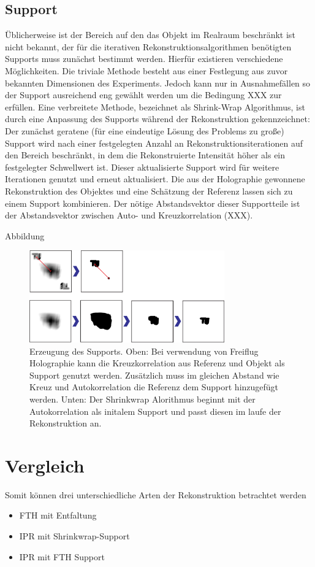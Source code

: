 \subsection{Support}
Üblicherweise ist der Bereich auf den das Objekt im Realraum beschränkt ist nicht bekannt, der für die iterativen Rekonstruktionsalgorithmen benötigten Supports muss zunächst bestimmt werden. Hierfür existieren verschiedene Möglichkeiten. Die triviale Methode besteht aus einer Festlegung aus zuvor bekannten Dimensionen des Experiments. Jedoch kann nur in Ausnahmefällen so der Support ausreichend eng gewählt werden um die Bedingung XXX zur erfüllen.
Eine verbreitete Methode, bezeichnet als Shrink-Wrap Algorithmus, ist durch eine Anpassung des Supports während der Rekonstruktion gekennzeichnet: Der zunächst geratene (für eine eindeutige Lösung des Problems  zu große) Support wird nach einer festgelegten Anzahl an Rekonstruktionsiterationen auf den Bereich beschränkt, in dem die Rekonstruierte Intensität höher als ein festgelegter Schwellwert ist. Dieser aktualisierte Support wird für weitere Iterationen genutzt und erneut aktualisiert\cite{marchesini2003}.
Die aus der Holographie gewonnene Rekonstruktion des Objektes und eine Schätzung der Referenz lassen sich zu einem Support kombinieren. Der nötige Abstandsvektor dieser Supportteile ist der  Abstandsvektor zwischen Auto- und Kreuzkorrelation (XXX).

Abbildung
	\begin{figure}
		\centering
		\includegraphics[width=0.75\textwidth]{images/support.eps}
		\caption[Supportgenerierung]{Erzeugung des Supports. Oben: Bei verwendung von Freiflug Holographie kann die Kreuzkorrelation aus Referenz und Objekt als Support genutzt werden. Zusätzlich muss im gleichen Abstand wie Kreuz und Autokorrelation die Referenz dem Support hinzugefügt werden. Unten: Der Shrinkwrap Alorithmus beginnt mit der Autokorrelation als initalem Support und passt diesen im laufe der Rekonstruktion an.}
		\label{fig:support}
	\end{figure} 
\section{Vergleich}	
Somit können drei unterschiedliche Arten der Rekonstruktion betrachtet werden
\begin{itemize}
\item FTH mit Entfaltung
\item IPR mit Shrinkwrap-Support
\item IPR mit FTH Support
\end{itemize}

